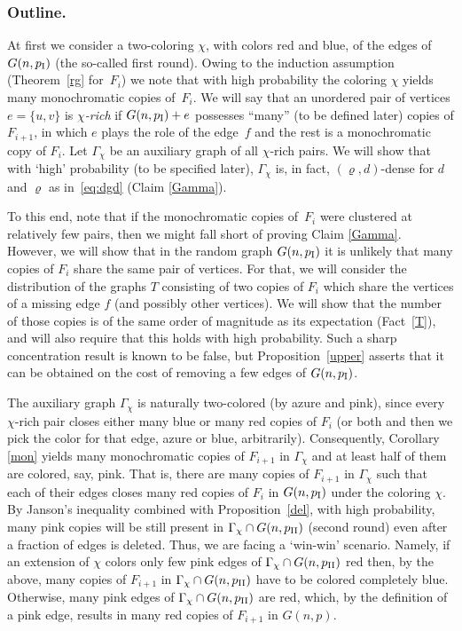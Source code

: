 \documentclass[reqno, 12pt]{amsart}
\let\rho=\varrho
\begin{document}
\subsubsection*{Outline.} At first we consider a two-coloring $\chi$, with colors red and blue,
of the edges of~$G(n,p_{\rm I})$ (the so-called first round). Owing to the induction assumption (Theorem~\ref{rg} for~$F_{i}$) we
note that with high probability the coloring $\chi$ yields many monochromatic copies of~$F_i$. We
will say that an unordered pair of vertices $e=\{u,v\}$ is \emph{$\chi$-rich}  if $G(n,p_{\rm
I})+e$ possesses ``many'' (to be defined later) copies of $F_{i+1}$, in which $e$ plays the role of
the edge~$f$ and the rest is a monochromatic copy of $F_i$. Let $\Gamma_\chi$ be an auxiliary graph
of all $\chi$-rich pairs. We will show that with `high' probability  (to be specified later),
$\Gamma_\chi$ is, in fact, $(\rho,d)$-dense for $d$ and $\rho$ as in~\eqref{eq:dgd} (Claim \ref{Gamma}).

 To this end, note that if the  monochromatic copies of~$F_i$  were clustered at relatively few
pairs, then we might fall short of proving Claim \ref{Gamma}. However,
we will show that in the random graph $G(n,p_{\rm I})$ it is unlikely that many copies of $F_i$ share the same 
pair of vertices. For that, we will consider the distribution of the graphs $T$ consisting of two copies of
$F_i$ which share the vertices of a missing edge $f$ (and possibly other vertices). We will show
that the number of those copies is of the same order of magnitude as its expectation (Fact~\ref{T}), and will also require that this
holds with high probability. Such a sharp concentration result
is known to be false, but Proposition~\ref{upper} asserts that it can be obtained on the cost of
removing a few edges of $G(n,p_{\rm I})$.

The auxiliary graph $\Gamma_\chi$ is naturally two-colored (by azure and pink), since every $\chi$-rich pair closes either
many blue or many red copies of $F_i$ (or both and then we pick the color for that edge, azure or blue,
arbitrarily). Consequently, Corollary \ref{mon} yields many monochromatic copies of $F_{i+1}$
in $\Gamma_\chi$ and at least half of them are colored, say, pink. That is, there are many copies of
$F_{i+1}$ in $\Gamma_\chi$ such that each of their edges closes many red copies of $F_i$ in
$G(n,p_{\rm I})$ under the coloring $\chi$. By Janson's inequality combined with Proposition~\ref{del}, with high probability, many pink copies will be still present in $\Gamma_{\chi}\cap G(n,p_{\rm II})$
 (second round) even after a fraction of edges is deleted. Thus, we are facing a `win-win' scenario. Namely, if an extension of $\chi$
 colors only few pink edges of $\Gamma_{\chi}\cap G(n,p_{\rm II})$ red then, by the above, many copies of $F_{i+1}$ in $\Gamma_{\chi}\cap G(n,p_{\rm II})$ have to be
colored completely blue.
 Otherwise, many pink edges of $\Gamma_{\chi}\cap G(n,p_{\rm II})$ are red, which, by the definition of a pink edge, results in many red copies of $F_{i+1}$ in $G(n,p)$.
 
\end{document}
